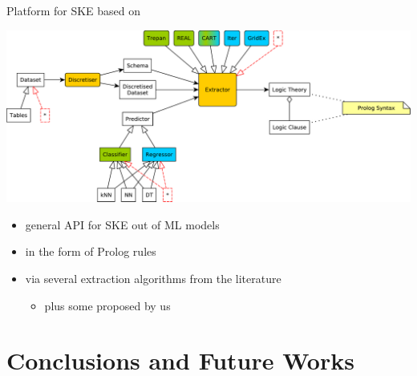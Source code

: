 \documentclass[presentation]{beamer}\mode<presentation>{\usetheme{AMSBolognaFC}}
\begin{document}
\begin{frame}{Platform for SKE based on \twopkt{}}
    \begin{center}
        \includegraphics[width=.8\linewidth]{figures/Psyke.pdf}
    \end{center}
    \vfill
    \begin{itemize}
        \item general \alert{API} for \alert{SKE} out of ML models
        \vfill
        \item in the form of \alert{Prolog rules}
        \vfill
        \item via several extraction algorithms from the literature
        \begin{itemize}
            \item plus some proposed by us
        \end{itemize}
    \end{itemize}
\end{frame}

\section{Conclusions and Future Works}
\end{document}
